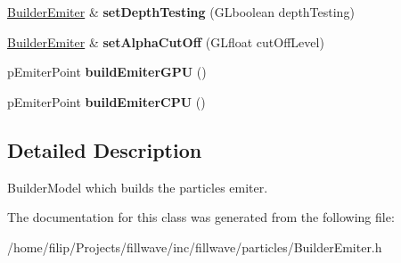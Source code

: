 \begin{DoxyCompactItemize}
\item 
\hypertarget{classfillwave_1_1particles_1_1BuilderEmiter_a95a6d92e796c5c1e7f4bd0cd818dac95}{}\hyperlink{classfillwave_1_1particles_1_1BuilderEmiter}{Builder\+Emiter} \& {\bfseries set\+Depth\+Testing} (G\+Lboolean depth\+Testing)\label{classfillwave_1_1particles_1_1BuilderEmiter_a95a6d92e796c5c1e7f4bd0cd818dac95}

\item 
\hypertarget{classfillwave_1_1particles_1_1BuilderEmiter_a0d53a8cdc2f8f5a3309bc4164f045db4}{}\hyperlink{classfillwave_1_1particles_1_1BuilderEmiter}{Builder\+Emiter} \& {\bfseries set\+Alpha\+Cut\+Off} (G\+Lfloat cut\+Off\+Level)\label{classfillwave_1_1particles_1_1BuilderEmiter_a0d53a8cdc2f8f5a3309bc4164f045db4}

\item 
\hypertarget{classfillwave_1_1particles_1_1BuilderEmiter_a7db80688312b1ee3d369192ef15f868a}{}p\+Emiter\+Point {\bfseries build\+Emiter\+G\+P\+U} ()\label{classfillwave_1_1particles_1_1BuilderEmiter_a7db80688312b1ee3d369192ef15f868a}

\item 
\hypertarget{classfillwave_1_1particles_1_1BuilderEmiter_a288fcdf3212a2621112c011ddd63ccc2}{}p\+Emiter\+Point {\bfseries build\+Emiter\+C\+P\+U} ()\label{classfillwave_1_1particles_1_1BuilderEmiter_a288fcdf3212a2621112c011ddd63ccc2}

\end{DoxyCompactItemize}


\subsection{Detailed Description}
Builder\+Model which builds the particles emiter. 

The documentation for this class was generated from the following file\+:\begin{DoxyCompactItemize}
\item 
/home/filip/\+Projects/fillwave/inc/fillwave/particles/Builder\+Emiter.\+h\end{DoxyCompactItemize}
